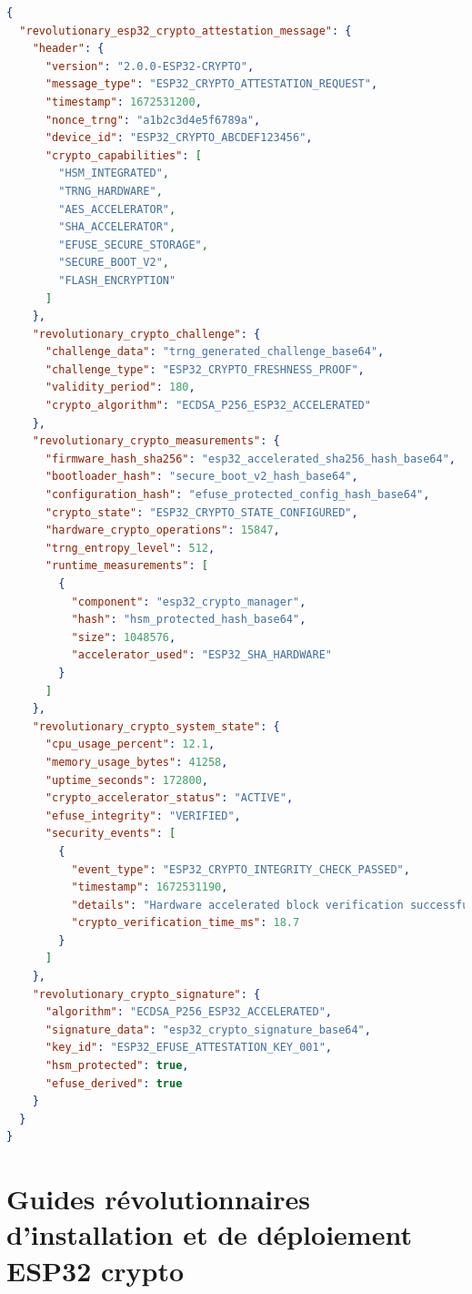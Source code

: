 \begin{lstlisting}[language=JSON, caption={Format révolutionnaire de message d'attestation crypto ESP32}]
{
  "revolutionary_esp32_crypto_attestation_message": {
    "header": {
      "version": "2.0.0-ESP32-CRYPTO",
      "message_type": "ESP32_CRYPTO_ATTESTATION_REQUEST",
      "timestamp": 1672531200,
      "nonce_trng": "a1b2c3d4e5f6789a", 
      "device_id": "ESP32_CRYPTO_ABCDEF123456",
      "crypto_capabilities": [
        "HSM_INTEGRATED",
        "TRNG_HARDWARE",
        "AES_ACCELERATOR",
        "SHA_ACCELERATOR",
        "EFUSE_SECURE_STORAGE",
        "SECURE_BOOT_V2",
        "FLASH_ENCRYPTION"
      ]
    },
    "revolutionary_crypto_challenge": {
      "challenge_data": "trng_generated_challenge_base64",
      "challenge_type": "ESP32_CRYPTO_FRESHNESS_PROOF",
      "validity_period": 180,
      "crypto_algorithm": "ECDSA_P256_ESP32_ACCELERATED"
    },
    "revolutionary_crypto_measurements": {
      "firmware_hash_sha256": "esp32_accelerated_sha256_hash_base64",
      "bootloader_hash": "secure_boot_v2_hash_base64",
      "configuration_hash": "efuse_protected_config_hash_base64",
      "crypto_state": "ESP32_CRYPTO_STATE_CONFIGURED",
      "hardware_crypto_operations": 15847,
      "trng_entropy_level": 512,
      "runtime_measurements": [
        {
          "component": "esp32_crypto_manager",
          "hash": "hsm_protected_hash_base64",
          "size": 1048576,
          "accelerator_used": "ESP32_SHA_HARDWARE"
        }
      ]
    },
    "revolutionary_crypto_system_state": {
      "cpu_usage_percent": 12.1,
      "memory_usage_bytes": 41258,
      "uptime_seconds": 172800,
      "crypto_accelerator_status": "ACTIVE",
      "efuse_integrity": "VERIFIED", 
      "security_events": [
        {
          "event_type": "ESP32_CRYPTO_INTEGRITY_CHECK_PASSED",
          "timestamp": 1672531190,
          "details": "Hardware accelerated block verification successful",
          "crypto_verification_time_ms": 18.7
        }
      ]
    },
    "revolutionary_crypto_signature": {
      "algorithm": "ECDSA_P256_ESP32_ACCELERATED",
      "signature_data": "esp32_crypto_signature_base64",
      "key_id": "ESP32_EFUSE_ATTESTATION_KEY_001",
      "hsm_protected": true,
      "efuse_derived": true
    }
  }
}
\end{lstlisting}

\chapter{Guides révolutionnaires d'installation et de déploiement ESP32 crypto}
\label{app:revolutionary-installation-guides}

